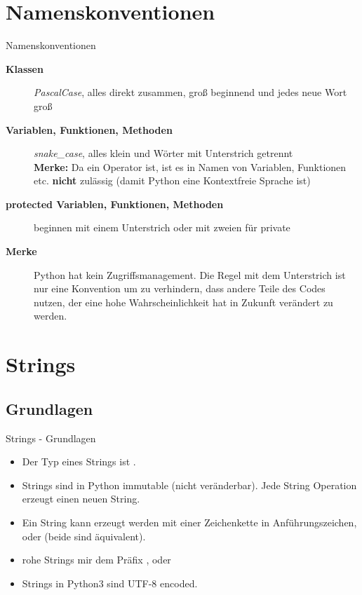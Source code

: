 \section{Namenskonventionen}
\begin{frame}[fragile]{Namenskonventionen}
	\begin{description}
	    \item[\textbf{Klassen}] \textit{PascalCase}, alles direkt zusammen, groß beginnend und jedes neue Wort groß
	    \item[\textbf{Variablen, Funktionen, Methoden}] \textit{snake\_case}, alles klein und Wörter mit Unterstrich getrennt \\
	    \textbf{Merke:} Da \codeline{-} ein Operator ist, ist es in Namen von Variablen, Funktionen etc. \textbf{nicht} zulässig (damit Python eine Kontextfreie Sprache ist)
	    \item[\textbf{protected Variablen, Funktionen, Methoden}] beginnen mit einem Unterstrich \codeline{\_} oder mit zweien \codeline{\_\_} für private
	    \item[\textbf{Merke}] Python hat kein Zugriffsmanagement. Die Regel mit dem Unterstrich ist nur eine Konvention um zu verhindern, dass andere Teile des Codes nutzen, der eine hohe Wahrscheinlichkeit hat in Zukunft verändert zu werden.
	\end{description}
\end{frame}


\section{Strings}
\subsection{Grundlagen}
\begin{frame}[fragile]{Strings - Grundlagen}
	\begin{itemize}
	    \item Der Typ eines Strings ist .
	    \item Strings sind in Python immutable (nicht veränderbar). Jede String Operation erzeugt einen neuen String.
	    \item Ein String kann erzeugt werden mit einer Zeichenkette in Anführungszeichen, \codeline{\'\'} oder \codeline{\"\"} (beide sind äquivalent).
	    \item rohe Strings mir dem Präfix ,  oder 
	    \item Strings in Python3 sind UTF-8 encoded.
	\end{itemize}
\end{frame}


